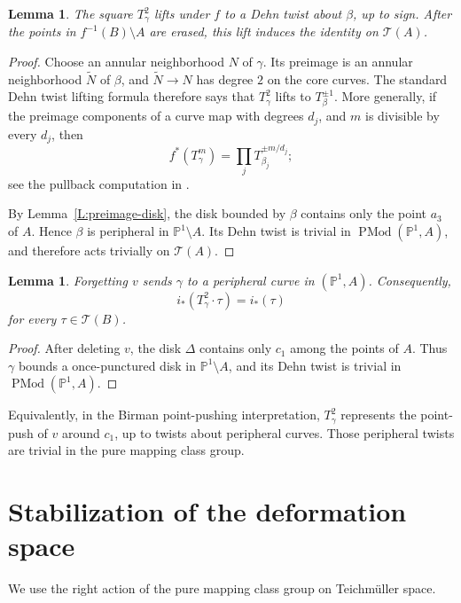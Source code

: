 \documentclass[11pt]{article}
\newtheorem{lemma}[theorem]{Lemma}
\theoremstyle{definition}
\theoremstyle{remark}
\newcommand{\TT}{\mathcal T}
\newcommand{\PMod}{\operatorname{PMod}}
\begin{document}
\begin{lemma}\label{L:twist-lift}
The square \(T_\gamma^2\) lifts under \(f\) to a Dehn twist about \(\beta\),
up to sign.  After the points in \(f^{-1}(B)\setminus A\) are erased, this
lift induces the identity on \(\TT(A)\).
\end{lemma}

\begin{proof}
Choose an annular neighborhood \(N\) of \(\gamma\).  Its preimage is an
annular neighborhood \(\widetilde N\) of \(\beta\), and
\(\widetilde N\to N\) has degree \(2\) on the core curves.  The standard Dehn
twist lifting formula therefore says that \(T_\gamma^2\) lifts to
\(T_\beta^{\pm1}\).  More generally, if the preimage components of a curve map
with degrees \(d_j\), and \(m\) is divisible by every \(d_j\), then
\[
f^*(T_\gamma^m)=\prod_j T_{\beta_j}^{\pm m/d_j};
\]
see the pullback computation in \cite{FKS-arxiv,FKS-pdf}.

By Lemma~\ref{L:preimage-disk}, the disk bounded by \(\beta\) contains only
the point \(a_3\) of \(A\).  Hence \(\beta\) is peripheral in
\(\mathbb P^1\setminus A\).  Its Dehn twist is trivial in
\(\PMod(\mathbb P^1,A)\), and therefore acts trivially on \(\TT(A)\).
\end{proof}

\begin{lemma}\label{L:forget-trivial}
Forgetting \(v\) sends \(\gamma\) to a peripheral curve in
\((\mathbb P^1,A)\).  Consequently,
\[
i_*(T_\gamma^{2}\cdot\tau)=i_*(\tau)
\]
for every \(\tau\in\TT(B)\).
\end{lemma}

\begin{proof}
After deleting \(v\), the disk \(\Delta\) contains only \(c_1\) among the
points of \(A\).  Thus \(\gamma\) bounds a once-punctured disk in
\(\mathbb P^1\setminus A\), and its Dehn twist is trivial in
\(\PMod(\mathbb P^1,A)\).
\end{proof}

Equivalently, in the Birman point-pushing interpretation, \(T_\gamma^2\)
represents the point-push of \(v\) around \(c_1\), up to twists about
peripheral curves.  Those peripheral twists are trivial in the pure mapping
class group.

\section{Stabilization of the deformation space}

We use the right action of the pure mapping class group on Teichm\"uller
space.
\end{document}
